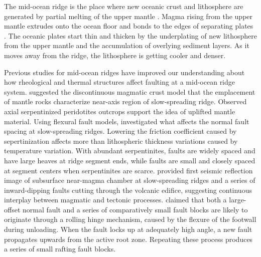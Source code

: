 \documentclass[letterpaper,12pt,notitle]{memphisthesis}                     %
\begin{document}
The mid-ocean ridge is the place where new oceanic crust and lithosphere are generated by partial melting of the upper mantle \citep{Cann1968}. Magma rising from the upper mantle extrudes onto the ocean floor and bonds to the edges of separating plates \citep{Chen1992}. The oceanic plates start thin and thicken by the underplating of new lithosphere from the upper mantle and the accumulation of overlying sediment layers. As it moves away from the ridge, the lithosphere is getting cooler and denser.

Previous studies for mid-ocean ridges have improved our understanding about how rheological and thermal structures affect faulting at a mid-ocean ridge system.
\citet{Cannat1993} suggested the discontinuous magmatic crust model that the emplacement of mantle rocks characterize near-axis region of slow-spreading ridge. Observed axial serpentinized peridotites outcrops support the idea of uplifted mantle material. Using flexural fault models, \citet{Escartin1997} investigated what affects the normal fault spacing at slow-spreading ridges. Lowering the friction coefficient caused by sepertinization affects more than lithospheric thickness variations caused by temperature variation. With abundant serpentinites, faults are widely spaced and have large heaves at ridge segment ends, while faults are small and closely spaced at segment centers when serpentinites are scarce. \citet{Singh2006} provided first seismic reflection image of subsurface near-magma chamber at slow-spreading ridges and a series of inward-dipping faults cutting through the volcanic edifice, suggesting continuous interplay between magmatic and tectonic processes. \citet{Reston2011} claimed that both a large-offset normal fault and a series of comparatively small fault blocks are likely to originate through a rolling hinge mechanism, caused by the flexure of the footwall during unloading. When the fault locks up at adequately high angle, a new fault propagates upwards from the active root zone. Repeating these process produces a series of small rafting fault blocks.
\end{document}
